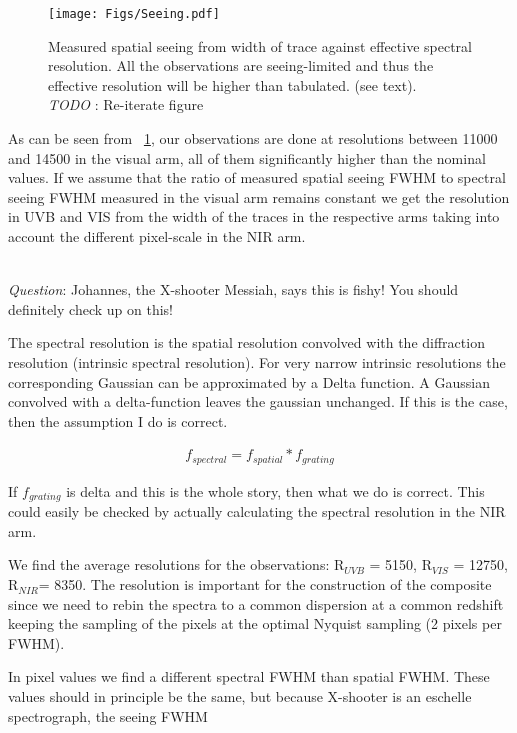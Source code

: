 \documentclass{aa}    %
\newcommand{\figref}[1]{\ref{fig:#1}}
\newcommand{\Fig}[1]{\figurename~\figref{#1}}
\newcommand{\fig}[1]{\Fig{#1}}
\newcommand{\figlabel}[1]{\label{fig:#1}}
\newcommand{\todo}[3]{{\color{#2}\emph{#1}: #3}}
\newcommand{\jstodo}[1]{\todo{ \\TODO }{green}{#1}}
\newcommand{\qtodo}[1]{\todo{\\ Question}{red}{#1}}
\begin{document}
\begin{figure}[hbtp]
  \centering
  \texttt{[image: Figs/Seeing.pdf]}
  \caption[]{Measured spatial seeing from width of trace against effective spectral resolution. All the observations are seeing-limited and thus the effective resolution will be higher than tabulated. (see text). \jstodo{Re-iterate figure} }
\figlabel{seeing}
\end{figure}



As can be seen from \fig{seeing}, our observations are done at resolutions between 11000 and 14500 in the visual arm, all of them significantly higher than the nominal values. If we assume that the ratio of measured spatial seeing FWHM to spectral seeing FWHM measured in the visual arm remains constant we get the resolution in UVB and VIS from the width of the traces in the respective arms taking into account the different pixel-scale in the NIR arm. 

\qtodo{Johannes, the X-shooter Messiah, says this is fishy! You should definitely check up on this!}

The spectral resolution is the spatial resolution convolved with the diffraction resolution (intrinsic spectral resolution). For very narrow intrinsic resolutions the corresponding Gaussian can be approximated by a Delta function. A Gaussian convolved with a delta-function leaves the gaussian unchanged. If this is the case, then the assumption I do is correct. 

\begin{eqnarray}
f_{spectral} = f_{spatial} \ast f_{grating}
\end{eqnarray}

If $f_{grating}$ is delta and this is the whole story, then what we do is correct. This could easily be checked by actually calculating the spectral resolution in the NIR arm.  


We find the average resolutions for the observations: R$_{UVB}$ = 5150, R$_{VIS}$ = 12750, R$_{NIR}$= 8350. The resolution is important for the construction of the composite since we need to rebin the spectra to a common dispersion at a common redshift keeping the sampling of the pixels at the optimal Nyquist sampling (2 pixels per FWHM). 

In pixel values we find a different spectral FWHM than spatial FWHM. These values should in principle be the same, but because X-shooter is an eschelle spectrograph, the seeing FWHM
\end{document}
